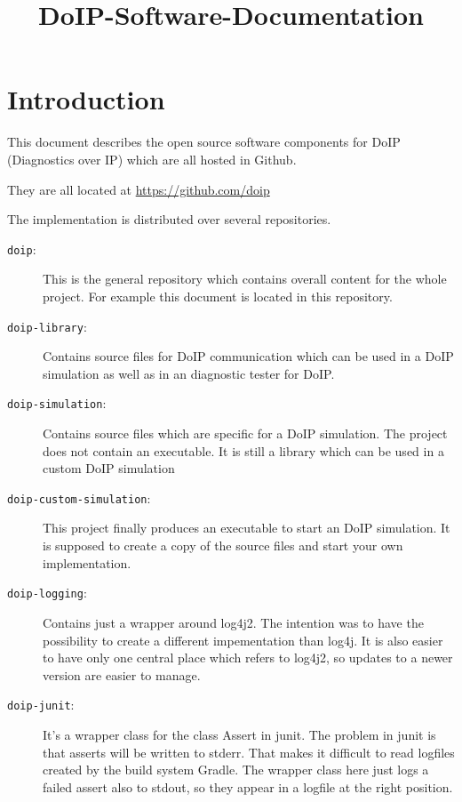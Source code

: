 \documentclass[a4paper]{article}
\title{DoIP-Software-Documentation}
\newcommand{\code}[1]{\texttt{#1}}
\begin{document}
\maketitle

\tableofcontents

\section{Introduction}

	This document describes the open source software components for
	DoIP (Diagnostics over IP) which are all hosted in Github.

	They are all located at \url{https://github.com/doip}

	The implementation is distributed over several repositories.
	
	\begin{description}
		
		\item[\code{doip}:] This is the general repository which contains
		overall content for the whole project. For example this document
		is located in this repository.

		\item[\code{doip-library}:] Contains source files for DoIP
		communication which can be used in a DoIP simulation as well as
		in an diagnostic tester for DoIP.

		\item[\code{doip-simulation}:] Contains source files which are
		specific for a DoIP simulation. The project does not contain an
		executable. It is still a library which can be used in a custom
		DoIP simulation

		\item[\code{doip-custom-simulation}:] This project finally produces
		an executable to start an DoIP simulation. It is supposed to create 
		a copy of the source files and start your own implementation.

		\item[\code{doip-logging}:] Contains just a wrapper around 
		log4j2. The intention was to have the possibility to create
		a different impementation than log4j. It is also easier to
		have only one central place which refers to log4j2, so updates 
		to a newer version are easier to manage.

		\item[\code{doip-junit}:] It's a wrapper class for the class
		Assert in junit. The problem in junit is that asserts will be written
		to stderr. That makes it difficult to read logfiles created
		by the build system Gradle. The wrapper class here just logs
		a failed assert also to stdout, so they appear in a logfile at
		the right position.

	\end{description}
\end{document}
